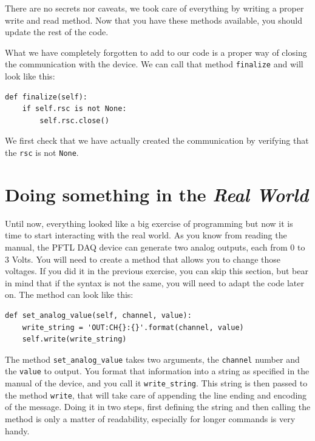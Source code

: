 There are no secrets nor caveats, we took care of everything by writing
a proper write and read method. Now that you have these methods
available, you should update the rest of the code.



What we have completely forgotten to add to our code is a proper way of 
closing the communication with the device. We can call that method
\texttt{finalize} and will look like this:

\begin{verbatim}
def finalize(self):
    if self.rsc is not None:
        self.rsc.close()
\end{verbatim}

We first check that we have actually created the
communication by verifying that the \texttt{rsc} is not \texttt{None}.

\section{Doing something in the \emph{Real World}}\label{doing-something-in-the-realworld}

Until now, everything looked like a big exercise of programming but now
it is time to start interacting with the real world. As you know from
reading the manual, the {PFTL DAQ} device can generate two analog
outputs, each from $0$ to $3$ Volts. You will need to create a method that
allows you to change those voltages. If you did it in the previous exercise, you can skip this section, but bear in mind that if the syntax is not the same, you will need to adapt the code later on. The method can look like this:

\begin{verbatim}
def set_analog_value(self, channel, value):
    write_string = 'OUT:CH{}:{}'.format(channel, value)
    self.write(write_string)
\end{verbatim}

The method \texttt{set_analog_value} takes two arguments, the
\texttt{channel} number and the \texttt{value} to output. You format that
information into a string as specified in the manual of the device, and you call it
\texttt{write_string}. This string is then passed to the method
\texttt{write}, that will take care of appending the line ending and
encoding of the message. Doing it in two steps, first defining the
string and then calling the method is only a matter of readability,
especially for longer commands is very handy.

